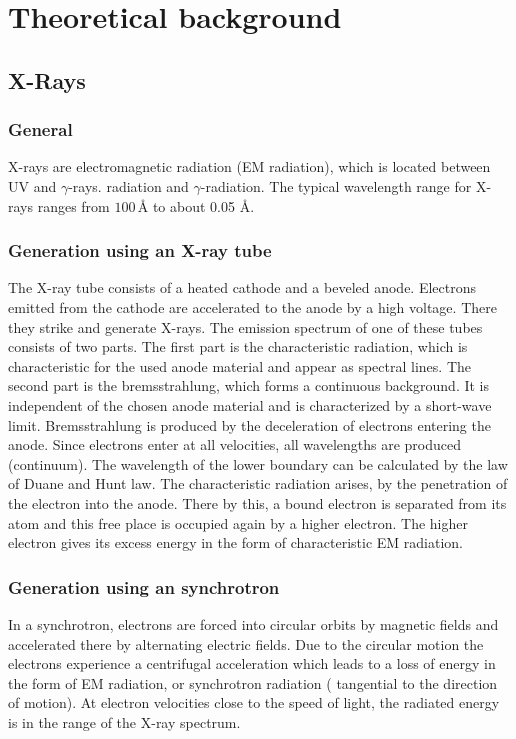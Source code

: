 \chapter{Theoretical background}
\label{chap:theory}

\section{X-Rays}

\subsection{General}
X-rays are electromagnetic radiation (EM radiation), which is located between UV and $\gamma$-rays.
radiation and $\gamma$-radiation. The typical wavelength range for
X-rays ranges from $100\,\text{\AA}$ to about 0.05 $\text{\AA}$.

\subsection{Generation using an X-ray tube}

The X-ray tube consists of a heated cathode and a beveled anode. Electrons emitted from the
cathode are accelerated to the anode by a high voltage.
There they strike and generate X-rays.
The emission spectrum of one of these tubes consists of two parts. The first part is the
characteristic radiation, which is characteristic for the used anode material and 
appear as spectral lines. The second part is the bremsstrahlung, which forms a continuous
background. It is independent of the chosen anode material and is characterized by a
short-wave limit. Bremsstrahlung is produced by the deceleration of electrons entering the anode.
Since electrons enter at all velocities, all wavelengths are produced (continuum).
The wavelength of the lower boundary can be calculated by the law of Duane and Hunt
law.
The characteristic radiation arises, by the penetration of the electron into the anode.
There by this, a bound electron is separated from its atom and this free
place is occupied again by a higher electron. The higher electron gives
its excess energy in the form of characteristic EM radiation.

\subsection{Generation using an synchrotron}

In a synchrotron, electrons are forced into circular orbits by magnetic fields
and accelerated there by alternating electric fields. Due to the circular motion
the electrons experience a centrifugal acceleration which leads to a loss of energy in the form of
EM radiation, or synchrotron radiation ( tangential to the direction of motion).
At electron velocities close to the speed of light, the radiated energy is in the
range of the X-ray spectrum.

